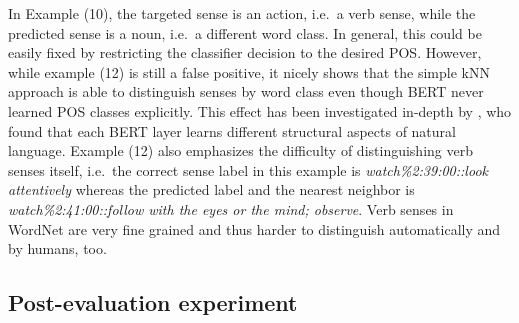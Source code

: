 \documentclass[11pt]{article}
\begin{document}
In Example (10), the targeted sense is an action, i.e.\ a verb sense, while the predicted sense is a noun, i.e.\ a different word class.   
In general, this could be easily fixed by restricting the classifier decision to the desired POS. 
However, while example (12) is still a false positive, it nicely shows that the simple kNN approach is able to distinguish senses by word class even though BERT never learned POS classes explicitly.
This effect has been investigated in-depth by , who found that each BERT layer learns different structural aspects of natural language.
Example (12) also emphasizes the difficulty of distinguishing verb senses itself, i.e.\ the correct sense label in this example is \emph{watch\%2:39:00::look attentively} whereas the predicted label and the nearest neighbor is \emph{watch\%2:41:00::follow with the eyes or the mind; observe}. Verb senses in WordNet are very fine grained and thus harder to distinguish automatically and by humans, too.


\subsection{Post-evaluation experiment}
\begin{table}
\centering
{}
\caption{Best POS-sensitive kNN models. Bold numbers are improved results over Table \ref{tab:knn}.}\label{tab:posteval}
\end{table}
\end{document}
